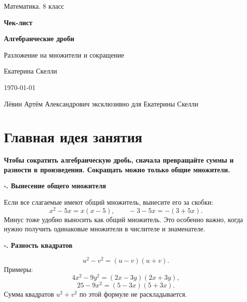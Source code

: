 \documentclass[a4paper,12pt]{article}
\newcommand{\topic}[1]{%
  \vspace{0.45em}
  {\large\bfseries\color{darkaccent}$\square$\;#1}\par
  \vspace{0.25em}
}
\newcommand{\keyidea}[1]{%
  \begin{center}
  \begin{minipage}{0.92\linewidth}
  \centering\bfseries\color{darkaccent}#1
  \end{minipage}
  \end{center}
}
\begin{document}
\begin{titlepage}
\thispagestyle{empty}
\centering
\vspace*{2.2cm}

{\Large\color{softgray}Математика. 8 класс\par}
\vspace{1.2cm}

{\fontsize{30}{36}\selectfont\bfseries\color{darkaccent}Чек-лист\par}
\vspace{0.45cm}
{\LARGE\bfseries Алгебраические дроби\par}
\vspace{0.25cm}
{\Large Разложение на множители и сокращение\par}

\vspace{2.0cm}
{\large Екатерина Скелли\par}
\vspace{0.5cm}
{\normalsize \today\par}

\vfill
{\small\color{textgray}Лёвин Артём Александрович эксклюзивно для Екатерины Скелли\par}
\vspace{0.7cm}

\end{titlepage}

\section*{Главная идея занятия}
\keyidea{Чтобы сократить алгебраическую дробь, сначала превращайте суммы и разности в произведения. Сокращать можно только общие множители.}

\topic{1. Вынесение общего множителя}
Если все слагаемые имеют общий множитель, вынесите его за скобки:
\[
 x^2-5x=x(x-5),
 \qquad
 -3-5x=-(3+5x).
\]
Минус тоже удобно выносить как общий множитель. Это особенно важно, когда нужно получить одинаковые множители в числителе и знаменателе.

\topic{2. Разность квадратов}
\[
 u^2-v^2=(u-v)(u+v).
\]
Примеры:
\[
4x^2-9y^2=(2x-3y)(2x+3y),
\]
\[
25-9x^2=(5-3x)(5+3x).
\]
Сумма квадратов $u^2+v^2$ по этой формуле не раскладывается.
\end{document}
